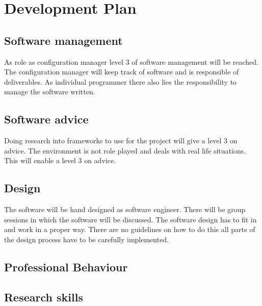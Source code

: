 \section{Development Plan}
\label{sec:development}

\subsection{Software management}
As role as configuration manager level 3 of software management will be reached. The configuration manager will keep track of software and is responsible of deliverables. As individual programmer there also lies the responsibility to manage the software written.

\subsection{Software advice}
Doing research into frameworks to use for the project will give a level 3 on advice. The environment is not role played and deals with real life situations. This will enable a level 3 on advice.

\subsection{Design}
The software will be hand designed as software engineer. There will be group sessions in which the software will be discussed. The software design has to fit in and work in a proper way. There are no guidelines on how to do this all parts of the design process have to be carefully implemented.

\subsection{Professional Behaviour}

\subsection{Research skills}


\subsection{}

